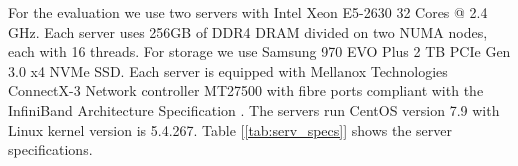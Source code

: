 \documentclass[nonacm,sigplan]{acmart}
\begin{document}
For the evaluation we use two servers with Intel Xeon E5-2630 32 Cores @ 2.4
GHz. Each server uses 256GB of DDR4 DRAM divided on two NUMA nodes, each with 16
threads. For storage we use Samsung 970 EVO Plus 2 TB PCIe Gen 3.0 x4 NVMe SSD.
Each server is equipped with Mellanox Technologies ConnectX-3 Network controller
MT27500 with fibre ports compliant with the InfiniBand Architecture
Specification . The servers run CentOS version 7.9 with Linux kernel version is
5.4.267. Table [\ref{tab:serv_specs}] shows the server specifications.
\begin{table}[H]
\caption{Server specifications table.}
\label{tab:serv_specs}
\end{table}
\end{document}

